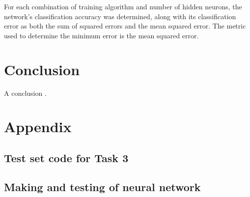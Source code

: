 \documentclass[a4paper, 10pt, conference]{ieeeconf}
\begin{document}
For each combination of training algorithm and number of hidden neurons, the network's classification accuracy was determined, along with its classification error as both the sum of squared errors and the mean squared error. The metric used to determine the minimum error is the mean squared error.



\section{Conclusion}

A conclusion \cite{pca}. 




\onecolumn
\section{Appendix} \label{sec:appendix}

\subsection*{Test set code for Task 3}

\newpage

\subsection*{Making and testing of neural network}

\newpage
\end{document}
